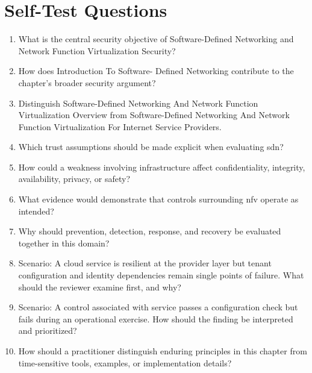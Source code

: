 \documentclass[11pt]{article}
\begin{document}
\section*{Self-Test Questions}
\begin{enumerate}
\item What is the central security objective of Software-Defined Networking and Network Function Virtualization Security?
\item How does Introduction To Software- Defined Networking contribute to the chapter's broader security argument?
\item Distinguish Software-Defined Networking And Network Function Virtualization Overview from Software-Defined Networking And Network Function Virtualization For Internet Service Providers.
\item Which trust assumptions should be made explicit when evaluating sdn?
\item How could a weakness involving infrastructure affect confidentiality, integrity, availability, privacy, or safety?
\item What evidence would demonstrate that controls surrounding nfv operate as intended?
\item Why should prevention, detection, response, and recovery be evaluated together in this domain?
\item Scenario: A cloud service is resilient at the provider layer but tenant configuration and identity dependencies remain single points of failure. What should the reviewer examine first, and why?
\item Scenario: A control associated with service passes a configuration check but fails during an operational exercise. How should the finding be interpreted and prioritized?
\item How should a practitioner distinguish enduring principles in this chapter from time-sensitive tools, examples, or implementation details?
\end{enumerate}
\end{document}
